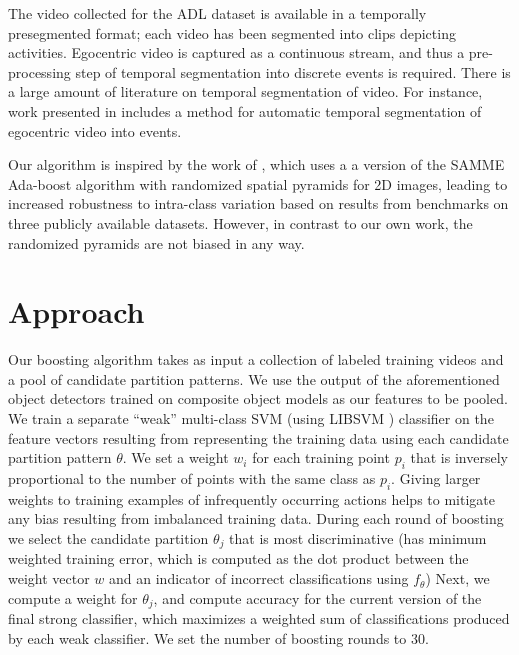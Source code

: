 \documentclass{bmvc2k}
\begin{document}
	The video collected for the ADL dataset is available in a temporally
	presegmented format; each video has been segmented into clips depicting
	activities. Egocentric video is captured as a continuous stream, and thus
  a pre-processing step of temporal segmentation into discrete events is
  required. There is a large amount of literature on temporal segmentation
  of video. For instance, work presented in \cite{Lee12} includes a method for
	automatic temporal segmentation of egocentric video into events.
  
	Our algorithm is inspired by the work of \cite{Jiang12}, which uses a
  a version of the SAMME Ada-boost algorithm \cite{Zhu06}
  with randomized spatial pyramids for 2D images, 
	leading to increased robustness to intra-class variation based on results
  from benchmarks on three publicly available datasets. However, in contrast
  to our own work, the randomized pyramids are not biased in any way. 
	

\section{Approach}

	Our boosting algorithm takes as input a collection of labeled training videos
	and a pool of candidate partition patterns. We use the output of the
  aforementioned object detectors trained on composite object models as our features to be
  pooled.
  We train a separate ``weak''
  multi-class SVM 
  (using LIBSVM \cite{Chang11})
	classifier on the feature vectors resulting from representing the training
	data using each candidate partition pattern $\theta$. We set a weight
  $w_i$ for each
	training point $p_i$ that is inversely proportional to the number of points
	with the same class as $p_i$. Giving larger weights to training examples of
  infrequently occurring actions helps to mitigate any bias resulting from imbalanced
  training data.
  During each round of boosting we select the
	candidate partition $\theta_j$ that is most discriminative (has minimum
  weighted training
	error, which is computed as the dot product between the weight vector $w$
  and an indicator of incorrect classifications using $f_\theta$)
  Next, we compute a weight for $\theta_j$, and compute accuracy for the
	current version of the final strong classifier, which maximizes a weighted
  sum of classifications produced by each weak classifier.
	We set the number of boosting rounds to 30.\\
\end{document}
